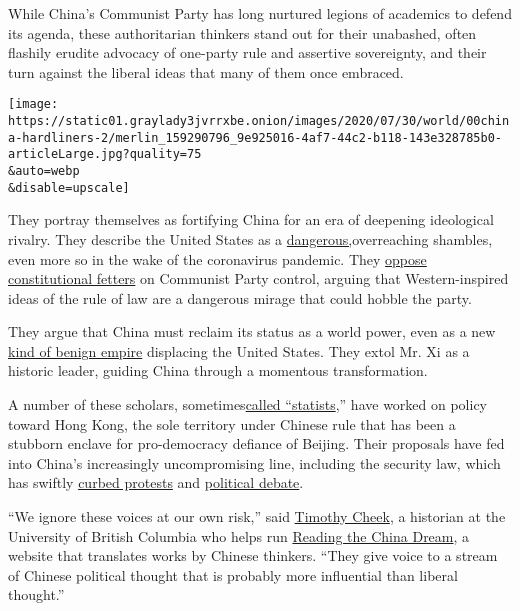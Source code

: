 While China's Communist Party has long nurtured legions of academics to
defend its agenda, these authoritarian thinkers stand out for their
unabashed, often flashily erudite advocacy of one-party rule and
assertive sovereignty, and their turn against the liberal ideas that
many of them once embraced.

\texttt{[image: https://static01.graylady3jvrrxbe.onion/images/2020/07/30/world/00china-hardliners-2/merlin\_159290796\_9e925016-4af7-44c2-b118-143e328785b0-articleLarge.jpg?quality=75\\\&auto=webp\\\&disable=upscale]}

They portray themselves as fortifying China for an era of deepening
ideological rivalry. They describe the United States as a
\href{http://www.publiclaw.cn/?c=news\&m=view\&id=7852}{dangerous,}overreaching
shambles, even more so in the wake of the coronavirus pandemic. They
\href{http://history.sina.com.cn/his/zl/2015-08-04/1454123837.shtml}{oppose
constitutional fetters} on Communist Party control, arguing that
Western-inspired ideas of the rule of law are a dangerous mirage that
could hobble the party.

They argue that China must reclaim its status as a world power, even as
a new
\href{https://www.readingthechinadream.com/jiang-shigong-empire-and-world-order.html}{kind
of benign empire} displacing the United States. They extol Mr. Xi as a
historic leader, guiding China through a momentous transformation.

A number of these scholars,
sometimes\href{https://www.researchgate.net/publication/326028916_The_Specter_of_Leviathan_A_Critique_of_Chinese_Statism_since_2000}{called
``statists},'' have worked on policy toward Hong Kong, the sole
territory under Chinese rule that has been a stubborn enclave for
pro-democracy defiance of Beijing. Their proposals have fed into China's
increasingly uncompromising line, including the security law, which has
swiftly
\href{https://www.nytimes3xbfgragh.onion/2020/07/01/world/asia/hong-kong-security-law-china.html}{curbed
protests} and
\href{https://www.nytimes3xbfgragh.onion/2020/07/08/world/asia/hong-kong-security-china-media.html}{political
debate}.

``We ignore these voices at our own risk,'' said
\href{https://history.ubc.ca/profile/timothy-cheek/}{Timothy Cheek}, a
historian at the University of British Columbia who helps run
\href{https://www.readingthechinadream.com/}{Reading the China Dream}, a
website that translates works by Chinese thinkers. ``They give voice to
a stream of Chinese political thought that is probably more influential
than liberal thought.''

